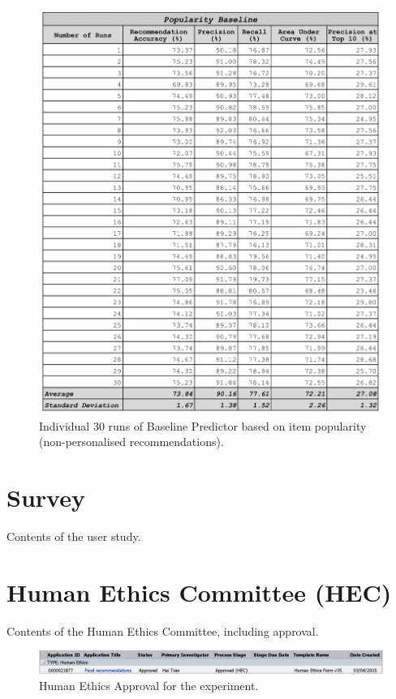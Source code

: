 \begin{appendices}
\begin{figure}
\centering
\includegraphics[scale=0.3]{appendices/popular_30_runs.png}
\caption{Individual 30 runs of Baseline Predictor based on item popularity (non-personalised recommendations). }
\label{fig:dual_algorithm}
\end{figure}

\chapter{Survey} \label{appendix:survey}

Contents of the user study. 




\chapter{Human Ethics Committee (HEC)} \label{appendix:hec}

Contents of the Human Ethics Committee, including approval.

\begin{figure} 
\centering
\includegraphics[scale=0.3]{appendices/hec_approval.png}
\caption{Human Ethics Approval for the experiment.}
\label{fig:hec_approval}
\end{figure}



\end{appendices}
